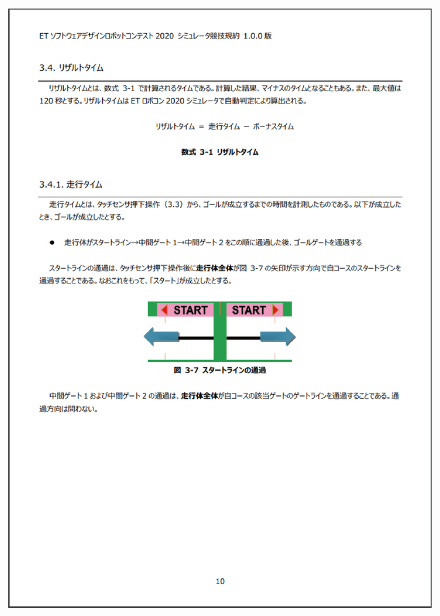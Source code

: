 \documentclass[uplatex, report, a4j, 10pt]{jsbook}
\begin{document}
\begin{figure}[tp]
    \begin{center}
    \includegraphics[width=\hsize]{specification/ET_7.eps}
    \end{center}
\end{figure}
\end{document}
